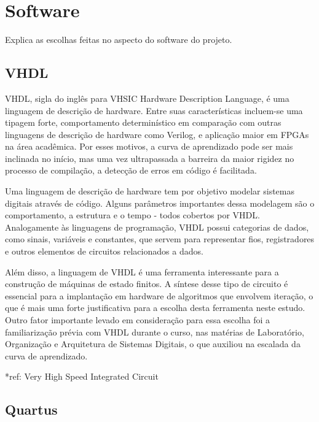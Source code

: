 	\section{Software}\label{sec-software}
	
	Explica as escolhas feitas no aspecto do software do projeto.
	
	\subsection{VHDL}\label{soft-vhdl}
	
	VHDL, sigla do inglês para VHSIC Hardware Description Language, é uma linguagem de descrição de hardware.  Entre suas características incluem-se uma tipagem forte, comportamento determinístico em comparação com outras linguagens de descrição de hardware como Verilog, e aplicação maior em FPGAs na área acadêmica. Por esses motivos, a curva de aprendizado pode ser mais inclinada no início, mas uma vez ultrapassada a barreira da maior rigidez no processo de compilação, a detecção de erros em código é facilitada.
	
	Uma linguagem de descrição de hardware tem por objetivo modelar sistemas digitais através de código. Alguns parâmetros importantes dessa modelagem são o comportamento, a estrutura e o tempo - todos cobertos por VHDL. Analogamente às linguagens de programação, VHDL possui categorias de dados, como sinais, variáveis e constantes, que servem para representar fios, registradores e outros elementos de circuitos relacionados a dados. 
	
	Além disso, a linguagem de VHDL é uma ferramenta interessante para a construção de máquinas de estado finitos. A síntese desse tipo de circuito é essencial para a implantação em hardware de algoritmos que envolvem iteração, o que é mais uma forte justificativa para a escolha desta ferramenta neste estudo. Outro fator importante levado em consideração para essa escolha foi a familiarização prévia com VHDL durante o curso, nas matérias de Laboratório, Organização e Arquitetura de Sistemas Digitais, o que auxiliou na escalada da curva de aprendizado.
	
	
	
	*ref: Very High Speed Integrated Circuit
	
	\subsection{Quartus}\label{soft-quartus}
	

